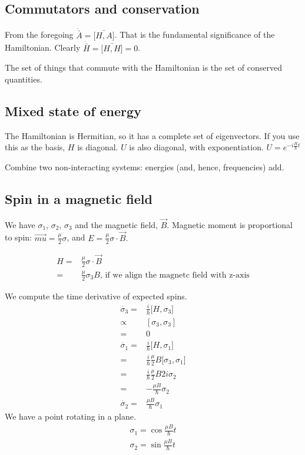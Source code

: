 \documentclass[]{article}
\begin{document}
\subsection{Commutators and conservation}

From the foregoing $\dot{\bar{A}} = \bar{\big[H,A\big]}$. That is the fundamental significance of the Hamiltonian. Clearly $\dot{\bar{H}} = \bar{\big[H,H\big]} = 0$.

The set of things that commute with the Hamiltonian is the set of conserved quantities.

\subsection{Mixed state of energy}

The Hamiltonian is Hermitian, so it has a complete set of eigenvectors. If you use this as the basis, $H$ is diagonal. $U$ is also diagonal, with exponentiation. $U = e^{-i\frac{H}{\hbar}t}$

Combine two non-interacting systems: energies (and, hence, frequencies) add.

\subsection{Spin in a magnetic field}

We have $\sigma_1$, $\sigma_2$, $\sigma_3$ and the magnetic field, $\vec{B}$. Magnetic moment is proportional to spin: $\vec{mu} = \frac{\mu}{2}\sigma$, and $E=\frac{\mu}{2}\sigma \cdot \vec{B}.$

\begin{align*}
	H =& \frac{\mu}{2}\sigma \cdot \vec{B}\\
	=& \frac{\mu}{2}\sigma_3 B \text{, if we align the magnetc field with z-axis}
\end{align*}

We compute the time derivative of expected spins.
\begin{align*}
	\dot{\sigma_3} =& \frac{i}{\hbar} \big[H,\sigma_3\big]\\
	\propto& [\sigma_3,\sigma_3] \\
	=& 0\\
	\dot{\sigma_1} =& \frac{i}{\hbar} \big[H,\sigma_1\big]\\
	=& \frac{i}{\hbar} \frac{\mu}{2} B \big[\sigma_3,\sigma_1\big]\\
	=& \frac{i}{\hbar} \frac{\mu}{2} B 2 i \sigma_2\\
	=& - \frac{\mu B}{\hbar} \sigma_2\\
	\dot{\sigma_2} =&  \frac{\mu B}{\hbar} \sigma_1
\end{align*}
We have a point rotating in a plane.
\begin{align*}
	\sigma_1 = \cos{\frac{\mu B}{\hbar} t}\\
	\sigma_2 = \sin{\frac{\mu B}{\hbar} t}
\end{align*}
\end{document}
